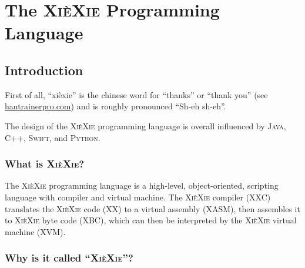 \documentclass[a5paper]{report}
\def\xiexie{\textsc{Xi\`eXie}\xspace}
\def\xxlang{\xiexie programming language\xspace}
\def\cpp{\textsc{C++}\xspace}
\def\java{\textsc{Java}\xspace}
\def\swift{\textsc{Swift}\xspace}
\def\python{\textsc{Python}\xspace}
\begin{document}
\fi


\tableofcontents



\part{The \xiexie Programming Language}



\chapter{Introduction}

First of all, ``xi\`exie'' is the chinese word for ``thanks'' or ``thank you''
(see \href{http://dictionary.hantrainerpro.com/chinese-english/translation-xiexie_thankyou.htm}{hantrainerpro.com})
and is roughly pronounced ``Sh-eh sh-eh''.

The design of the \xxlang is overall influenced by \java, \cpp, \swift, and \python.



\section{What is \xiexie?}

The \xiexie programming language is a high-level, object-oriented, scripting language with compiler and virtual machine.
The \xiexie compiler (XXC) translates the \xiexie code (XX) to a virtual assembly (XASM), then assembles it to
\xiexie byte code (XBC), which can then be interpreted by the \xiexie virtual machine (XVM).



\section{Why is it called ``\xiexie''?}
\end{document}
